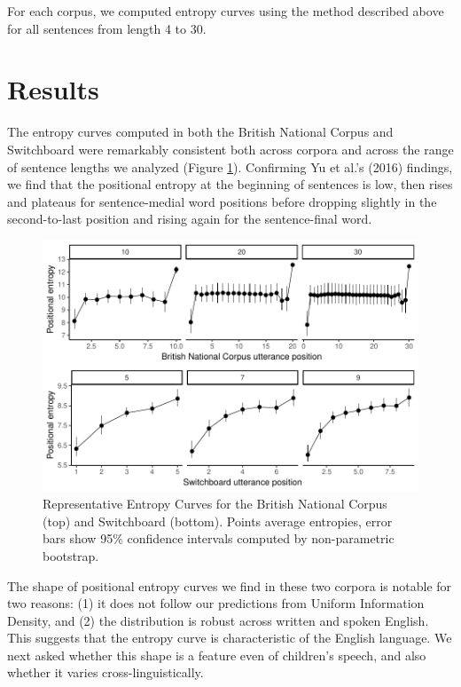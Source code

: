 \documentclass[10pt, letterpaper]{article}
\newenvironment{CodeChunk}{}{}
\begin{document}
For each corpus, we computed entropy curves using the method described
above for all sentences from length 4 to 30.

\section{Results}\label{results}

The entropy curves computed in both the British National Corpus and
Switchboard were remarkably consistent both across corpora and across
the range of sentence lengths we analyzed (Figure
\ref{fig:read_and_plot_exp1}). Confirming Yu et al.'s (2016) findings,
we find that the positional entropy at the beginning of sentences is
low, then rises and plateaus for sentence-medial word positions before
dropping slightly in the second-to-last position and rising again for
the sentence-final word.

\begin{CodeChunk}
\begin{figure}[tb]

{\centering \includegraphics{figs/read_and_plot_exp1-1} 

}

\caption[Representative Entropy Curves for the British National Corpus (top) and Switchboard (bottom)]{Representative Entropy Curves for the British National Corpus (top) and Switchboard (bottom). Points average entropies, error bars show 95\% confidence intervals computed by non-parametric bootstrap.}\label{fig:read_and_plot_exp1}
\end{figure}
\end{CodeChunk}

The shape of positional entropy curves we find in these two corpora is
notable for two reasons: (1) it does not follow our predictions from
Uniform Information Density, and (2) the distribution is robust across
written and spoken English. This suggests that the entropy curve is
characteristic of the English language. We next asked whether this shape
is a feature even of children's speech, and also whether it varies
cross-linguistically.
\end{document}
